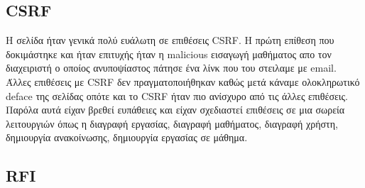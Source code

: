 \documentclass{article}
\begin{document}
\subsection*{\textlatin{CSRF}}
Η σελίδα ήταν γενικά πολύ ευάλωτη σε επιθέσεις \textlatin{CSRF}. Η πρώτη
επίθεση που δοκιμάστηκε και ήταν επιτυχής ήταν η \textlatin{malicious} εισαγωγή
μαθήματος απο τον διαχειριστή ο οποίος ανυποψίαστος πάτησε ένα λίνκ που του στειλαμε με
\textlatin{email}. Άλλες επιθέσεις με \textlatin{CSRF} δεν πραγματοποιήθηκαν καθώς μετά
κάναμε ολοκληρωτικό \textlatin{deface} της σελίδας οπότε και το \textlatin{CSRF} ήταν πιο
ανίσχυρο από τις άλλες επιθέσεις. Παρόλα αυτά είχαν βρεθεί ευπάθειες και είχαν σχεδιαστεί
επιθέσεις σε μια σωρεία λειτουργιών όπως η διαγραφή εργασίας, διαγραφή μαθήματος, διαγραφή
χρήστη, δημιουργία ανακοίνωσης, δημιουργία εργασίας σε μάθημα.



\subsection*{\textlatin{RFI}}
\end{document}
